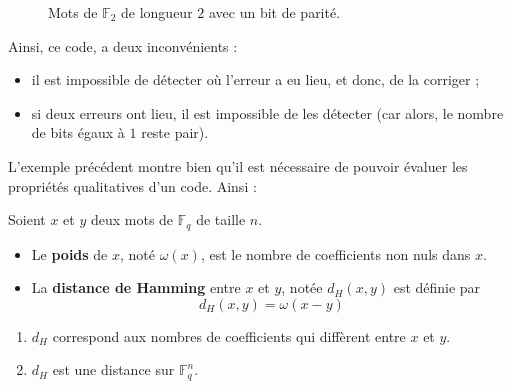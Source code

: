 \begin{example}
\begin{center}
\begin{minipage}{0.45\textwidth}
\begin{figure}[H]
\begin{center}
					\end{center}
					\caption{Mots de $\mathbb{F}_2$ de longueur $2$ avec un bit de parité.}
				\end{figure}
			\end{minipage}
		\end{center}
		Ainsi, ce code, a deux inconvénients :
		\begin{itemize}
			\item il est impossible de détecter où l'erreur a eu lieu, et donc, de la corriger ;
			\item si deux erreurs ont lieu, il est impossible de les détecter (car alors, le nombre de bits égaux à $1$ reste pair).
		\end{itemize}
	\end{example}
	
	L'exemple précédent montre bien qu'il est nécessaire de pouvoir évaluer les propriétés qualitatives d'un code. Ainsi :
	
	\begin{definition}
		Soient $x$ et $y$ deux mots de $\mathbb{F}_q$ de taille $n$.
		\begin{itemize}
			\item Le \textbf{poids} de $x$, noté $\omega(x)$, est le nombre de coefficients non nuls dans $x$.
			\item La \textbf{distance de Hamming} entre $x$ et $y$, notée $d_H(x,y)$ est définie par
			\[ d_H(x,y) = \omega(x-y) \]
		\end{itemize}
	\end{definition}
	
	\begin{proposition}
		\begin{enumerate}[label=(\roman*)]
			\item $d_H$ correspond aux nombres de coefficients qui diffèrent entre $x$ et $y$.
			\item $d_H$ est une distance sur $\mathbb{F}_q^n$.
		\end{enumerate}
	\end{proposition}
	

